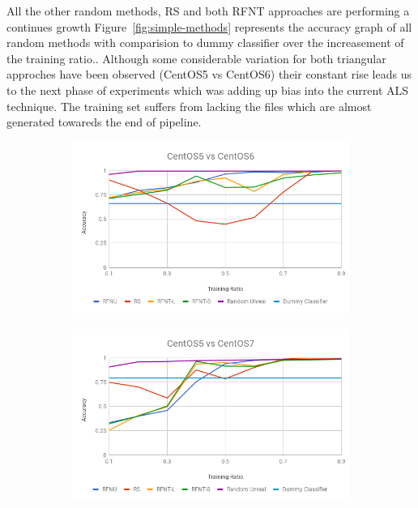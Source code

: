 \documentclass[10pt, conference, compsocconf]{IEEEtran}
\begin{document}
All the other random methods, RS and both RFNT approaches 
are performing a continues growth Figure~\ref{fig:simple-methods} represents
the accuracy graph of all random methods with comparision to dummy
classifier over the increasement of the training ratio.. Although some considerable variation 
for both triangular approches have been observed (CentOS5 vs CentOS6) 
their constant rise leads us to the next phase of experiments which was 
adding up bias into the current ALS technique. 
The training set suffers from lacking the files which are almost generated towareds the end of pipeline.

\begin{figure}[h!]
        \centering
        \begin{subfigure}[b]{0.4\linewidth}
                \includegraphics[width=\columnwidth]{figures/simple-methods-5vs6}
        \end{subfigure}
        \begin{subfigure}[b]{0.4\linewidth}
		\includegraphics[width=\columnwidth]{figures/simple-methods-5vs7}

\end{subfigure}
\end{figure}
\end{document}
